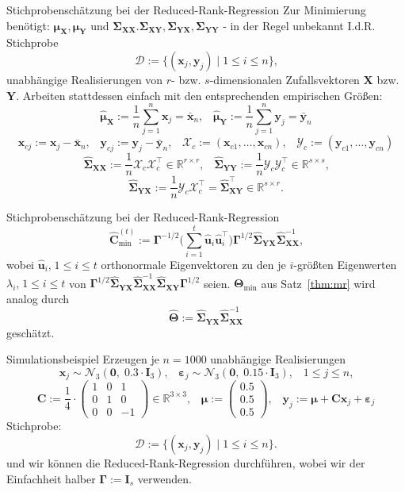 \documentclass[12pt, aspectratio=169]{beamer}
\newcommand{\R}{\mathbb{R}}
\newcommand{\X}{\mathbf{X}}
\newcommand{\Y}{\mathbf{Y}}
\newcommand{\T}{\bm{\Theta}}
\newcommand{\muu}{\bm{\mu}}
\newcommand{\Ssigma}{\bm{\Sigma}}
\newcommand{\uu}{\mathbf{u}}
\newcommand{\C}{\mathbf{C}}
\newcommand{\Ggamma}{\bm{\Gamma}}
\newcommand{\xx}{\mathbf{x}}
\newcommand{\yy}{\mathbf{y}}
\newcommand{\XX}{\mathcal{X}}
\newcommand{\YY}{\mathcal{Y}}
\begin{document}
\begin{frame}{Stichprobenschätzung bei der Reduced-Rank-Regression}
	Zur Minimierung benötigt: $\muu_\X, \muu_\Y$ und $\Ssigma_{\X\X}. \Ssigma_{\X\Y}, \Ssigma_{\Y\X}, \Ssigma_{\Y\Y}$  - in der Regel  unbekannt 
	I.d.R. Stichprobe 
	\[\mathcal{D} := \{(\xx_j, \yy_j) \;|\; 1 \leq i \leq n\} \text{,}\]
	unabhängige Realisierungen von $r$- bzw. $s$-dimensionalen Zufallsvektoren $\X$ bzw. $\Y$.
	Arbeiten stattdessen einfach mit den entsprechenden empirischen Größen:
	\[\widehat{\muu}_{\X} := \frac{1}{n} \sum_{j=1}^{n} \mathbf{x}_j = \bar{\xx}_n \text{,} \quad \widehat{\muu}_{\Y} := \frac{1}{n} \sum_{j=1}^{n} \mathbf{y}_j = \bar{\yy}_n\]
	$$\xx_{cj} := \xx_j - \bar{\xx}_n \text{,} \quad \yy_{cj} := \yy_j - \bar{\yy}_n \text{,} \quad \XX_c := (\xx_{c1},\dots,\xx_{cn}) \text{,} \quad \YY_c := (\yy_{c1},\dots,\yy_{cn})$$
	$$ \widehat{\Ssigma}_{\X\X} := \frac{1}{n} \XX_c \XX_c^\top \in \R^{r \times r} \text{,} \quad \widehat{\Ssigma}_{\Y\Y} := \frac{1}{n} \YY_c \YY_c^\top \in \R^{s \times s} \text{,}$$
	\[\widehat{\Ssigma}_{\Y\X} := \frac{1}{n} \YY_c \XX_c^\top = \widehat{\Ssigma}_{\X\Y}^\top \in \R^{s \times r} \text{.}\]
\end{frame}

\begin{frame}{Stichprobenschätzung bei der Reduced-Rank-Regression}
	$$\widehat{\C}^{(t)}_{\min} := \Ggamma^{-1/2} \biggl( \sum_{i=1}^{t} \widehat{\uu}_i \widehat{\uu}_i^\top \biggr) \Ggamma^{1/2} \widehat{\Ssigma}_{\Y\X} \widehat{\Ssigma}_{\X\X}^{-1} \text{,}$$
	wobei $\widehat{\uu}_i\text{,} \; 1 \leq i \leq t$ orthonormale Eigenvektoren zu den je $i$-größten Eigenwerten $\lambda_i \text{,} \; 1 \leq i \leq t$ von
	$\Ggamma^{1/2} \widehat{\Ssigma}_{\Y\X} \widehat{\Ssigma}_{\X\X}^{-1} \widehat{\Ssigma}_{\X\Y} \Ggamma^{1/2}$ seien. $\T_{\min}$ aus Satz~\ref{thm:mr} wird analog durch
	$$\widehat{\T} := \widehat{\Ssigma}_{\Y\X} \widehat{\Ssigma}_{\X\X}^{-1}$$
	geschätzt.
\end{frame}

\begin{frame}{Simulationsbeispiel}
	Erzeugen je $n=1000$ unabhängige Realisierungen 
	$$\xx_j \sim \mathcal{N}_3(\mathbf{0}, \; 0.3 \cdot \mathbf{I}_3)\text{,} \quad \bm{\varepsilon}_j \sim \mathcal{N}_3(\mathbf{0}, \; 0.15 \cdot \mathbf{I}_3)\text{,}\quad 1 \leq j \leq n \text{,}$$
	$$\C := \frac{1}{4} \cdot \begin{pmatrix}
	1 & 0 & 1 \\
	0 & 1 & 0 \\
	0 & 0 & -1
	\end{pmatrix} \in \R^{3 \times 3} \text{,} \quad \muu := \begin{pmatrix}
	0.5 \\
	0.5 \\
	0.5
	\end{pmatrix} \text{,} \quad \yy_j := \muu + \C \xx_j + \bm{\varepsilon}_j$$
	Stichprobe:
	\[\mathcal{D} := \{(\xx_j, \yy_j) \;|\; 1 \leq i \leq n\}\text{.}\]
	und wir können die Reduced-Rank-Regression durchführen, wobei wir der Einfachheit halber $\Ggamma := \mathbf{I}_s$ verwenden.
\end{frame}
\end{document}
